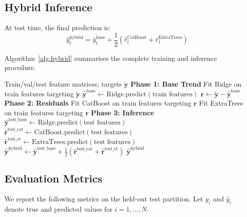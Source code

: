 \documentclass[conference]{IEEEtran}
\begin{document}
  \subsection{Hybrid Inference}

  At test time, the final prediction is:
  \begin{equation}
    \hat{y}_{t}^{\text{hybrid}}= \hat{y}_{t}^{\text{base}}+ \frac{1}{2}\left( \hat{r}_{t}^{\text{CatBoost}}+ \hat{r}_{t}^{\text{ExtraTrees}}\right)
  \end{equation}

  Algorithm~\ref{alg:hybrid} summarises the complete training and inference procedure.

  \begin{algorithm}
    \caption{Hybrid Residual Training and Inference}
    \label{alg:hybrid}
    \begin{algorithmic}
      [1] \REQUIRE Train/val/test feature matrices; targets $\tilde{\mathbf{y}}$
      \STATE \textbf{Phase 1: Base Trend}
      \STATE Fit Ridge on train features targeting $\tilde{\mathbf{y}}$
      \STATE $\hat{\mathbf{y}}^{\text{base}} \leftarrow \text{Ridge.predict}(\text{train features})$
      \STATE $\mathbf{r} \leftarrow \tilde{\mathbf{y}} - \hat{\mathbf{y}}^{\text{base}}$
      \STATE \textbf{Phase 2: Residuals}
      \STATE Fit CatBoost on train features targeting $\mathbf{r}$
      \STATE Fit ExtraTrees on train features targeting $\mathbf{r}$
      \STATE \textbf{Phase 3: Inference}
      \STATE $\hat{\mathbf{y}}^{\text{test\_base}} \leftarrow \text{Ridge.predict}(\text{test features})$
      \STATE $\hat{\mathbf{r}}^{\text{test\_cat}} \leftarrow \text{CatBoost.predict}(\text{test features})$
      \STATE $\hat{\mathbf{r}}^{\text{test\_et}} \leftarrow \text{ExtraTrees.predict}(\text{test features})$
      \STATE $\hat{\mathbf{y}}^{\text{hybrid}} \leftarrow \hat{\mathbf{y}}^{\text{test\_base}} + \frac{1}{2}(\hat{\mathbf{r}}^{\text{test\_cat}} + \hat{\mathbf{r}}^{\text{test\_et}})$
      \RETURN $\hat{\mathbf{y}}^{\text{hybrid}}$
    \end{algorithmic}
  \end{algorithm}

  \subsection{Evaluation Metrics}

  We report the following metrics on the held-out test partition. Let $y_{i}$ and
  $\hat{y}_{i}$ denote true and predicted values for $i = 1, \ldots, N$.
\end{document}
